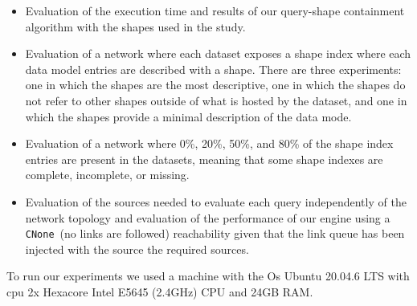 \begin{itemize}
   \item Evaluation of the execution time and results of our query-shape containment algorithm with the shapes used in the study.
   \item Evaluation of a network where each dataset exposes a shape index where each data model entries are described with a shape. 
   There are three experiments: one in which the shapes are the most descriptive, one in which the shapes do not refer to other shapes outside of what is hosted by the dataset, and one in which the shapes provide a minimal description of the data mode.
   \item Evaluation of a network where 0\%, 20\%, 50\%, and 80\% of the shape index entries are present in the datasets, meaning that some shape indexes are complete, incomplete, or missing.
   \item Evaluation of the sources needed to evaluate each query independently of the network topology and evaluation of the performance of our engine using a \texttt{CNone}~\cite{Hartig2012}(no links are followed) reachability given that the link queue has been injected with the source the required sources.
 \end{itemize}

To run our experiments we used a machine with the Os Ubuntu 20.04.6 LTS with cpu 2x Hexacore Intel E5645 (2.4GHz) CPU and 24GB RAM.

\iffalse
102x pcgen3 nodes
https://doc.ilabt.imec.be/ilabt/virtualwall/hardware.html#virtual-wall-2
\fi

